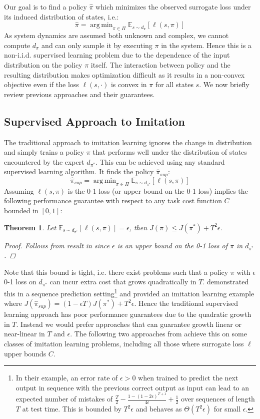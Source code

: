 \documentclass[twoside]{article}
\newtheorem{theorem}{Theorem}[section]
\DeclareMathOperator*{\argmin}{arg\,min}
\begin{document}
Our goal is to find a policy $\hat{\pi}$ which minimizes the observed surrogate loss under its induced distribution of states, i.e.:
\begin{equation}
\hat{\pi} = \argmin_{\pi \in \Pi} \mathbb{E}_{s \sim d_\pi}[\ell(s,\pi)]
\end{equation}
As system dynamics are assumed both unknown and complex, we cannot compute $d_\pi$ and can only sample it by executing $\pi$ in the system. Hence this is a non-i.i.d. supervised learning problem due to the dependence of the input distribution on the policy $\pi$ itself. The interaction between
policy and the resulting distribution makes optimization difficult as it results in a non-convex objective even if the loss $\ell(s,\cdot{})$ is convex in $\pi$ for all states $s$. We now briefly review previous approaches and their guarantees.
%
\subsection{Supervised Approach to Imitation}
The traditional approach to imitation learning ignores the change in distribution and simply trains a policy $\pi$ that performs well under the distribution of states encountered by the expert $d_{\pi^*}$. This can be achieved using any standard supervised learning algorithm. It finds the policy $\hat{\pi}_{sup}$:
\begin{equation}
\hat{\pi}_{sup} = \argmin_{\pi \in \Pi} \mathbb{E}_{s \sim d_{\pi^*}}[\ell(s,\pi)]
\end{equation}
Assuming $\ell(s,\pi)$ is the 0-1 loss (or upper bound on the 0-1 loss) implies the following performance guarantee with respect to any task cost function $C$ bounded in $[0,1]$:
\begin{theorem}
\citep{Ross10} Let $\mathbb{E}_{s \sim d_{\pi^*}}[\ell(s,\pi)] = \epsilon$, then $J(\pi) \leq J(\pi^*) + T^2 \epsilon$.
\begin{proof}
Follows from result in \citet{Ross10} since $\epsilon$ is an upper bound on the 0-1 loss of $\pi$ in $d_{\pi^*}$.
\end{proof}
\end{theorem}
%
Note that this bound is tight, i.e. there exist problems such that a policy $\pi$ with $\epsilon$ 0-1 loss on $d_{\pi^*}$ can incur extra cost that grows quadratically in $T$. \citet{Kaariainen06} demonstrated this in a sequence prediction setting\footnote{In their example, an error rate of $\epsilon > 0$ when trained to predict the next output in sequence with the previous correct output as input can lead to an expected number of mistakes of $\frac{T}{2} - \frac{1-(1-2\epsilon)^{T+1}}{4\epsilon} + \frac{1}{2}$ over sequences of length $T$ at test time. This is bounded by $T^2 \epsilon$ and behaves as $\Theta(T^2\epsilon)$ for small $\epsilon$.} and \citet{Ross10} provided an imitation learning example where $J(\hat{\pi}_{sup}) = (1-\epsilon T)J(\pi^*) + T^2 \epsilon$. Hence the traditional supervised learning approach has poor performance guarantees due to the quadratic growth in $T$. Instead we would prefer approaches that can guarantee growth linear or near-linear in $T$ and $\epsilon$. The following two approaches from \citet{Ross10} achieve this on some classes of imitation learning problems, including all those where surrogate loss $\ell$ upper bounds $C$.
\end{document}
